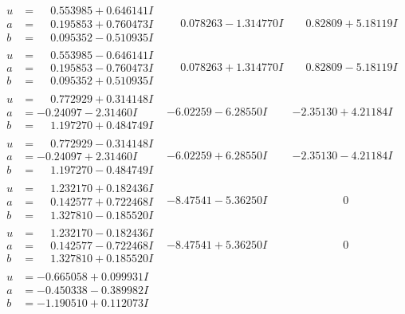\documentclass[1p]{elsarticle_modified}
\theoremstyle{definition}
\begin{document}
$$\begin{array}{c|c|c}
\begin{aligned}
u &= \phantom{-}0.553985 + 0.646141 I \\
a &= \phantom{-}0.195853 + 0.760473 I \\
b &= \phantom{-}0.095352 - 0.510935 I\end{aligned}
 & \phantom{-}0.078263 - 1.314770 I & \phantom{-}0.82809 + 5.18119 I \\ \hline\begin{aligned}
u &= \phantom{-}0.553985 - 0.646141 I \\
a &= \phantom{-}0.195853 - 0.760473 I \\
b &= \phantom{-}0.095352 + 0.510935 I\end{aligned}
 & \phantom{-}0.078263 + 1.314770 I & \phantom{-}0.82809 - 5.18119 I \\ \hline\begin{aligned}
u &= \phantom{-}0.772929 + 0.314148 I \\
a &= -0.24097 - 2.31460 I \\
b &= \phantom{-}1.197270 + 0.484749 I\end{aligned}
 & -6.02259 - 6.28550 I & -2.35130 + 4.21184 I \\ \hline\begin{aligned}
u &= \phantom{-}0.772929 - 0.314148 I \\
a &= -0.24097 + 2.31460 I \\
b &= \phantom{-}1.197270 - 0.484749 I\end{aligned}
 & -6.02259 + 6.28550 I & -2.35130 - 4.21184 I \\ \hline\begin{aligned}
u &= \phantom{-}1.232170 + 0.182436 I \\
a &= \phantom{-}0.142577 + 0.722468 I \\
b &= \phantom{-}1.327810 - 0.185520 I\end{aligned}
 & -8.47541 - 5.36250 I & \phantom{-0.000000 } 0 \\ \hline\begin{aligned}
u &= \phantom{-}1.232170 - 0.182436 I \\
a &= \phantom{-}0.142577 - 0.722468 I \\
b &= \phantom{-}1.327810 + 0.185520 I\end{aligned}
 & -8.47541 + 5.36250 I & \phantom{-0.000000 } 0 \\ \hline\begin{aligned}
u &= -0.665058 + 0.099931 I \\
a &= -0.450338 - 0.389982 I \\
b &= -1.190510 + 0.112073 I\end{aligned}

\end{array}$$
\end{document}
